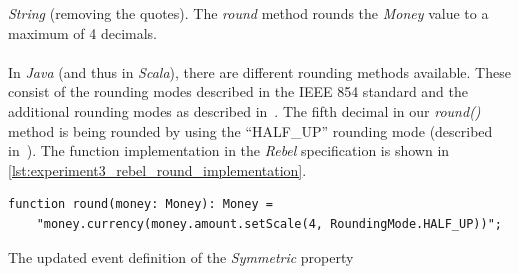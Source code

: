 \textit{String} (removing the quotes). The \textit{round} method rounds the
\textit{Money} value to a maximum of 4 decimals.\\
\\
In \textit{Java} (and thus in \textit{Scala}), there are different rounding
methods available. These consist of the rounding modes described in the IEEE 854
standard and the additional rounding modes as described
in~\cite{cowlishaw2003decimal}. The fifth decimal in our \textit{round()} method
is being rounded by using the ``HALF\_UP'' rounding mode
(described in~\cite{cowlishaw2003decimal}). The function implementation in the
\textit{Rebel} specification is shown in
\autoref{lst:experiment3_rebel_round_implementation}.
\begin{sourcecode}[!ht]
\begin{lstlisting}[language=Rebel]
function round(money: Money): Money =
    "money.currency(money.amount.setScale(4, RoundingMode.HALF_UP))";
\end{lstlisting}
\caption{The updated event definition of the \textit{Symmetric} property}
\label{lst:experiment3_rebel_round_implementation}
\end{sourcecode}
\FloatBarrier

